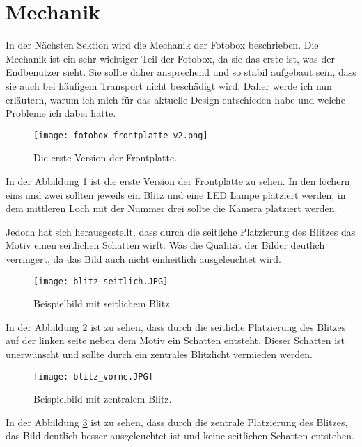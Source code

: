 \graphicspath{{images/mechanics}}

\section{Mechanik}

In der Nächsten Sektion wird die Mechanik der Fotobox beschrieben.
Die Mechanik ist ein sehr wichtiger Teil der Fotobox, da sie das erste
ist, was der Endbenutzer sieht. Sie sollte daher ansprechend und so stabil
aufgebaut sein, dass sie auch bei häufigem Transport nicht beschädigt wird.
Daher werde ich nun erläutern, warum ich mich für das aktuelle Design entschieden habe
und welche Probleme ich dabei hatte.

\begin{figure}[H]
    \centering
    \texttt{[image: fotobox\_frontplatte\_v2.png]}
    \caption{Die erste Version der Frontplatte.}
    \label{fig:frontplatte_v1}
\end{figure}

In der Abbildung \ref{fig:frontplatte_v1} ist die erste Version der Frontplatte zu sehen.
In den löchern eins und zwei sollten jeweils ein Blitz und eine LED Lampe platziert werden,
in dem mittleren Loch mit der Nummer drei sollte die Kamera platziert werden.


Jedoch hat sich herausgestellt, dass durch die seitliche Platzierung des Blitzes
das Motiv einen seitlichen Schatten wirft. Was die Qualität der Bilder deutlich verringert,
da das Bild auch nicht einheitlich ausgeleuchtet wird.

\newpage
\begin{figure}[H]
    \centering
    \texttt{[image: blitz\_seitlich.JPG]}
    \caption{Beispielbild mit seitlichem Blitz.}
    \label{fig:seitlicher_blitzt}
\end{figure}

In der Abbildung \ref{fig:seitlicher_blitzt} ist zu sehen, dass durch die seitliche Platzierung des Blitzes 
auf der linken seite neben dem Motiv ein Schatten entsteht. Dieser Schatten ist unerwünscht und sollte
durch ein zentrales Blitzlicht vermieden werden.

\begin{figure}[H]
    \centering
    \texttt{[image: blitz\_vorne.JPG]}
    \caption{Beispielbild mit zentralem Blitz.}
    \label{fig:zentraler_blitz}
\end{figure}

In der Abbildung \ref{fig:zentraler_blitz} ist zu sehen, dass durch die zentrale Platzierung des Blitzes,
das Bild deutlich besser ausgeleuchtet ist und keine seitlichen Schatten entstehen. 